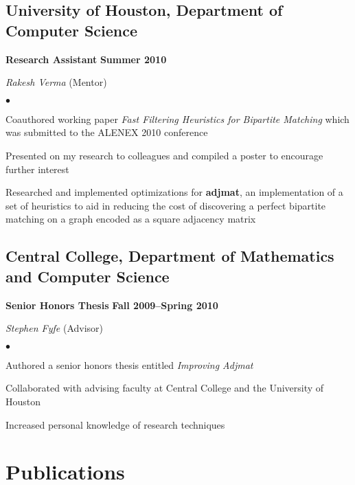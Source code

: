 \documentclass[10pt,letterpaper]{article}
\renewenvironment{itemize}{
  \begin{list}{}{
      \setlength{\leftmargin}{1.5em}
      \setlength{\itemsep}{0.25em}
      \setlength{\parskip}{0pt}
      \setlength{\parsep}{0.25em}
    }
  }{
  \end{list}
}
\newenvironment{bitemize}{
  \begin{list}{\(\bullet \)}{
      \setlength{\leftmargin}{1.5em}
      \setlength{\itemsep}{0.25em}
      \setlength{\parskip}{0pt}
      \setlength{\parsep}{0.25em}
    }
  }{
  \end{list}
}
\newcommand{\yearrange}[1]{\hfill \textbf{#1} \par}
\begin{document}
\subsection*{University of Houston, Department of Computer Science}

\begin{itemize}
\item \textbf{Research Assistant} \yearrange{Summer 2010}
  \textit{Rakesh Verma} (Mentor)
  \begin{bitemize}
  \item Coauthored working paper \textit{Fast Filtering Heuristics for
      Bipartite Matching} which was submitted to the ALENEX 2010
    conference
  \item Presented on my research to colleagues and compiled a poster
    to encourage further interest
  \item Researched and implemented optimizations for
    \textbf{adjmat}, an implementation of a set of heuristics to aid
    in reducing the cost of discovering a perfect bipartite matching
    on a graph encoded as a square adjacency matrix
  \end{bitemize}
\end{itemize}

\subsection*{Central College, Department of Mathematics and
  Computer Science}

\begin{itemize}
\item \textbf{Senior Honors Thesis} \yearrange{Fall
    2009--Spring 2010}
  \textit{Stephen Fyfe} (Advisor)
  \begin{bitemize}
  \item Authored a senior honors thesis entitled \textit{Improving Adjmat}
  \item Collaborated with advising faculty at Central College and the
    University of Houston
  \item Increased personal knowledge of research techniques
  \end{bitemize}
\end{itemize}

\pagebreak

\section*{Publications}
\end{document}
